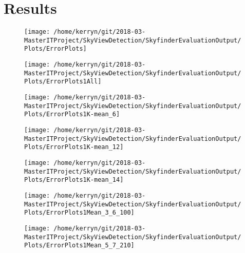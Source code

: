 \documentclass[final,3p,times,authoryear]{elsarticle}
\begin{document}
\section{Results}\label{sec:results}





\begin{figure}
\centering
\texttt{[image: /home/kerryn/git/2018-03-MasterITProject/SkyViewDetection/SkyfinderEvaluationOutput/Plots/ErrorPlots]}
\caption{}
\label{fig:errorplots}
\end{figure}
\begin{figure}
\centering
\texttt{[image: /home/kerryn/git/2018-03-MasterITProject/SkyViewDetection/SkyfinderEvaluationOutput/Plots/ErrorPlots1All]}
\caption{}
\label{fig:errorplots1all}
\end{figure}
\begin{figure}
\centering
\texttt{[image: /home/kerryn/git/2018-03-MasterITProject/SkyViewDetection/SkyfinderEvaluationOutput/Plots/ErrorPlots1K-mean\_6]}
\caption{}
\label{fig:errorplots1k-mean6}
\end{figure}
\begin{figure}
\centering
\texttt{[image: /home/kerryn/git/2018-03-MasterITProject/SkyViewDetection/SkyfinderEvaluationOutput/Plots/ErrorPlots1K-mean\_12]}
\caption{}
\label{fig:errorplots1k-mean12}
\end{figure}
\begin{figure}
\centering
\texttt{[image: /home/kerryn/git/2018-03-MasterITProject/SkyViewDetection/SkyfinderEvaluationOutput/Plots/ErrorPlots1K-mean\_14]}
\caption{}
\label{fig:errorplots1k-mean14}
\end{figure}
\begin{figure}
\centering
\texttt{[image: /home/kerryn/git/2018-03-MasterITProject/SkyViewDetection/SkyfinderEvaluationOutput/Plots/ErrorPlots1Mean\_3\_6\_100]}
\caption{}
\label{fig:errorplots1mean36100}
\end{figure}
\begin{figure}
\centering
\texttt{[image: /home/kerryn/git/2018-03-MasterITProject/SkyViewDetection/SkyfinderEvaluationOutput/Plots/ErrorPlots1Mean\_5\_7\_210]}
\caption{}
\label{fig:errorplots1mean57210}
\end{figure}
\end{document}
